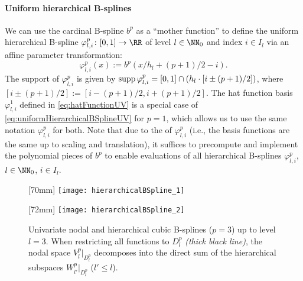 \paragraph{Uniform hierarchical B-splines}

%
We can use the cardinal B-spline $b^p$ as a ``mother function'' to
define the uniform hierarchical B-spline
$\varphi_{l,i}^p\colon [0, 1] \to \RR$ of level $l \in \NN_0$ and index
$i \in I_l$ via an affine parameter transformation:
\begin{equation}
  \label{eq:uniformHierarchicalBSplineUV}
  \varphi_{l,i}^p(x)
  := b^p(x/h_l + (p+1)/2 - i).
\end{equation}
The support of $\varphi_{l,i}^p$ is given
by $\operatorname{supp} \varphi_{l,i}^p = [0, 1] \cap (h_l \cdot [i \pm (p+1)/2])$,
where $[i \pm (p+1)/2] := [i - (p+1)/2, i + (p+1)/2]$.
The hat function basis $\varphi_{l,i}^1$ defined in
\eqref{eq:hatFunctionUV} is a special case of
\eqref{eq:uniformHierarchicalBSplineUV} for $p = 1$,
which allows us to use the same notation $\varphi_{l,i}^p$ for both.
Note that due to the  of $\varphi_{l,i}^p$
(i.e., the basis functions are the same up to scaling and translation),
it suffices to precompute and implement the polynomial pieces of $b^p$
to enable evaluations of all hierarchical B-splines
$\varphi_{l,i}^p$, $l \in \NN_0$, $i \in I_l$.

\begin{figure}
  [70mm]{%
    \texttt{[image: hierarchicalBSpline\_1]}%
  }%
  \hfill%
  \hfill%
  [72mm]{%
    \texttt{[image: hierarchicalBSpline\_2]}%
  }%
  \caption{%
    Univariate nodal and hierarchical cubic B-splines ($p = 3$)
    up to level $l = 3$.
    When restricting all functions to $D_l^p$ \emph{(thick black line)},
    the nodal space $V_l^p|_{D_l^p}$ decomposes into the direct sum
    of the hierarchical subspaces $W_{l'}^p|_{D_l^p}$ ($l' \le l$).%
  }
  \label{fig:hierarchicalBSpline}
\end{figure}

